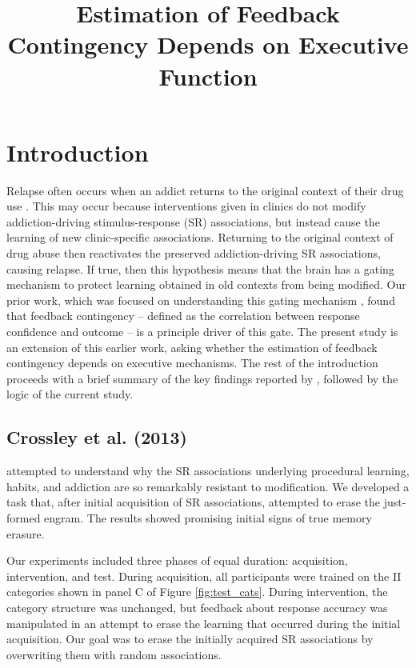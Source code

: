 \documentclass[apacite,draftfirst,man]{apa6}
\title{Estimation of Feedback Contingency Depends on Executive Function}
\begin{document}
\maketitle

\section*{Introduction}
Relapse often occurs when an addict returns to the original context of their
drug use \cite{higgins_outpatient_1995}. This may occur because interventions
given in clinics do not modify addiction-driving stimulus-response (SR)
associations, but instead cause the learning of new clinic-specific
associations. Returning to the original context of drug abuse then reactivates
the preserved addiction-driving SR associations, causing relapse. If true, then
this hypothesis means that the brain has a gating mechanism to protect learning
obtained in old contexts from being modified. Our prior work, which was focused
on understanding this gating mechanism \cite{crossley_erasing_2013}, found that
feedback contingency -- defined as the correlation between response confidence
and outcome -- is a principle driver of this gate. The present study is an
extension of this earlier work, asking whether the estimation of feedback
contingency depends on executive mechanisms. The rest of the introduction
proceeds with a brief summary of the key findings reported by
\cite{crossley_erasing_2013}, followed by the logic of the current study.

\subsection*{Crossley et al. (2013)}
 attempted to understand why the SR associations
underlying procedural learning, habits, and addiction are so remarkably
resistant to modification. We developed a task that, after initial acquisition
of SR associations, attempted to erase the just-formed engram. The results
showed promising initial signs of true memory erasure.

Our experiments included three phases of equal duration: acquisition,
intervention, and test. During acquisition, all participants were trained on the
II categories shown in panel C of Figure \ref{fig:test_cats}. During
intervention, the category structure was unchanged, but feedback about response
accuracy was manipulated in an attempt to erase the learning that occurred
during the initial acquisition. Our goal was to erase the initially acquired SR
associations by overwriting them with random associations.
\end{document}

